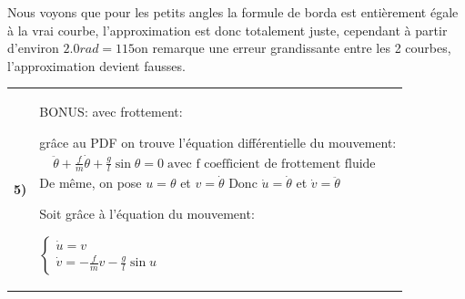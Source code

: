 \documentclass{article}
\newcommand{\question}[2]
{
    \begin{tabularx}{\linewidth}{lX}
        \textbf{#1)} & {#2}
    \end{tabularx} 
}
\newcommand{\txt}[1]{
    \;\text{#1}\;\;
}
\begin{document}
{{      Nous voyons que pour les petits angles la formule de borda est entièrement égale à la vrai courbe, l'approximation est donc totalement juste, cependant à partir d'environ $2.0rad=115$\textdegree on remarque une erreur grandissante entre les 2 courbes, l'approximation devient fausses.
    }

    \question{5}{
      BONUS: avec frottement:

      grâce au PDF on trouve l'équation différentielle du mouvement:
      \begin{align*}
        \boxed{\ddot{\theta}+\frac{f}{m}\dot{\theta}+\frac{g}{l}\sin\theta=0} \txt{avec f coefficient de frottement fluide}
      \end{align*}
      De même, on pose $u=\theta$ et $v=\dot{\theta}$
      Donc $\dot{u}=\dot{\theta}$ et $\dot{v}=\ddot{\theta}$

      Soit grâce à l'équation du mouvement:

      $\boxed{\begin{cases}
        \dot{u}=v \\
        \dot{v}=-\frac{f}{m}v -\frac{g}{l}\sin u
      \end{cases}}$

}}
\end{document}
